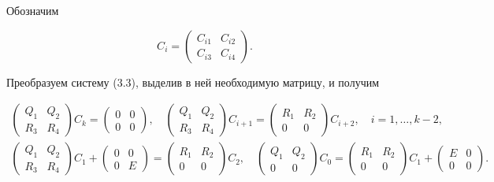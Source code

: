 Обозначим 


$$ 


C_i=\begin{pmatrix}C_{i1} & C_{i2}\\ C_{i3} & C_{i4} \end{pmatrix}. 


$$ 


Преобразуем систему (3.3), выделив в ней необходимую матрицу, и получим 


\begin{gather*} 


\begin{pmatrix}Q_1 & Q_2 \\ R_3 & R_4 \end{pmatrix}C_k= 


\begin{pmatrix}0 & 0 \\ 0 & 0 \end{pmatrix},\quad 


\begin{pmatrix}Q_1 & Q_2 \\ R_3 & R_4 \end{pmatrix}C_{i+1}= 


\begin{pmatrix}R_1 & R_2 \\ 0 & 0 \end{pmatrix}C_{i+2},\quad 


i=1,\dotsc,k-2,\\ 


% 


\begin{pmatrix}Q_1 & Q_2 \\ R_3 & R_4 \end{pmatrix}C_1+ 


\begin{pmatrix}0 & 0 \\ 0 & E \end{pmatrix}= 


\begin{pmatrix}R_1 & R_2 \\ 0 & 0 \end{pmatrix}C_2,\quad 


\begin{pmatrix}Q_1 & Q_2 \\ 0 & 0 \end{pmatrix}C_0= 


\begin{pmatrix}R_1 & R_2 \\ 0 & 0 \end{pmatrix}C_1+ 


\begin{pmatrix}E & 0 \\ 0 & 0 \end{pmatrix}. 


\end{gather*} 


